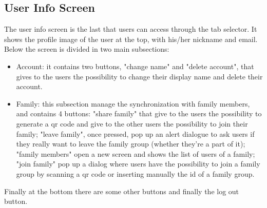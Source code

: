 \subsection{User Info Screen}
The user info screen is the last that users can access through the tab selector. It shows the profile image of the user at the top, with his/her nickname and email. Below the screen is divided in two main subsections:
\begin{itemize}
    \item Account: it contains two buttons, "change name" and "delete account", that gives to the users the possibility to change their display name and delete their account.
    \item Family: this subsection manage the synchronization with family members, and contains 4 buttons: "share family" that give to the users the possibility to generate a qr code and give to the other users the possibility to join their family; "leave family", once pressed, pop up an alert dialogue to ask users if they really want to leave the family group (whether they're a part of it); "family members" open a new screen and shows the list of users of a family; "join family" pop up a dialog where users have the possibility to join a family group by scanning a qr code or inserting manually the id of a family group.
\end{itemize}

Finally at the bottom there are some other buttons and finally the log out button.\newpage


